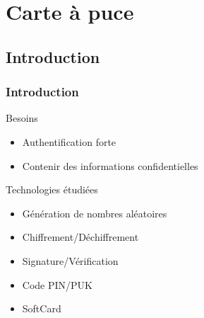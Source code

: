 \documentclass{beamer}
\begin{document}
\section{Carte à puce}

\subsection{Introduction}
\begin{frame}
\frametitle{Introduction}
\begin{block}{Besoins}
\begin{itemize}
\item Authentification forte
\item Contenir des informations confidentielles
\end{itemize}
\end{block}

\begin{exampleblock}{Technologies étudiées}
\begin{itemize}
\item Génération de nombres aléatoires
\item Chiffrement/Déchiffrement
\item Signature/Vérification
\item Code PIN/PUK
\item SoftCard
\end{itemize}
\end{exampleblock}

\end{frame}
\end{document}
